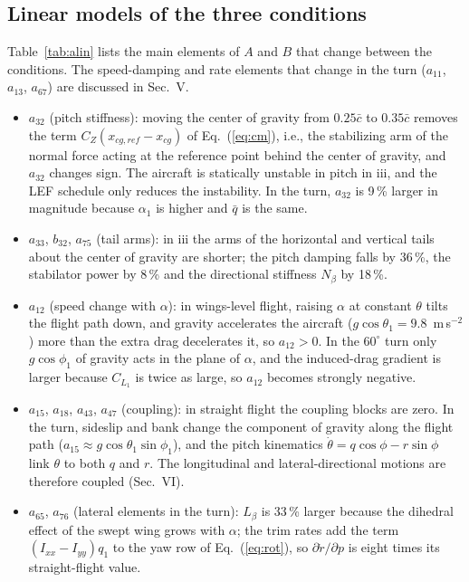 \documentclass[conf]{new-aiaa}
\begin{document}
\subsection{Linear models of the three conditions}
Table~\ref{tab:alin} lists the main elements of $A$ and $B$ that change between the conditions. The speed-damping and rate elements that change in the turn ($a_{11}$, $a_{13}$, $a_{67}$) are discussed in Sec.~V.
\begin{itemize}
\item $a_{32}$ (pitch stiffness): moving the center of gravity from $0.25\bar c$ to $0.35\bar c$ removes the term $C_Z(x_{cg,ref}-x_{cg})$ of Eq.~(\ref{eq:cm}), i.e., the stabilizing arm of the normal force acting at the reference point behind the center of gravity, and $a_{32}$ changes sign. The aircraft is statically unstable in pitch in iii, and the LEF schedule only reduces the instability. In the turn, $a_{32}$ is 9\,\% larger in magnitude because $\alpha_1$ is higher and $\bar q$ is the same.
\item $a_{33}$, $b_{32}$, $a_{75}$ (tail arms): in iii the arms of the horizontal and vertical tails about the center of gravity are shorter; the pitch damping falls by 36\,\%, the stabilator power by 8\,\% and the directional stiffness $N_\beta$ by 18\,\%.
\item $a_{12}$ (speed change with $\alpha$): in wings-level flight, raising $\alpha$ at constant $\theta$ tilts the flight path down, and gravity accelerates the aircraft ($g\cos\theta_1=9.8$~m\,s$^{-2}$) more than the extra drag decelerates it, so $a_{12}>0$. In the $60^\circ$ turn only $g\cos\phi_1$ of gravity acts in the plane of $\alpha$, and the induced-drag gradient is larger because $C_{L_1}$ is twice as large, so $a_{12}$ becomes strongly negative.
\item $a_{15}$, $a_{18}$, $a_{43}$, $a_{47}$ (coupling): in straight flight the coupling blocks are zero. In the turn, sideslip and bank change the component of gravity along the flight path ($a_{15}\approx g\cos\theta_1\sin\phi_1$), and the pitch kinematics $\dot\theta=q\cos\phi-r\sin\phi$ link $\theta$ to both $q$ and $r$. The longitudinal and lateral-directional motions are therefore coupled (Sec.~VI).
\item $a_{65}$, $a_{76}$ (lateral elements in the turn): $L_\beta$ is 33\,\% larger because the dihedral effect of the swept wing grows with $\alpha$; the trim rates add the term $(I_{xx}-I_{yy})q_1$ to the yaw row of Eq.~(\ref{eq:rot}), so $\partial\dot r/\partial p$ is eight times its straight-flight value.
\end{itemize}
\end{document}
